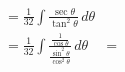 \documentclass[preview]{standalone}
\begin{document}
\begin{align*}
&=\frac{1}{32} \int \frac{\sec\theta}{\tan^2\theta }\, d\theta \\&=\frac{1}{32} \int \frac{\frac{1}{\cos\theta}}{\frac{\sin^2\theta}{\cos^2\theta}} \, d\theta&=
\end{align*}
\end{document}
